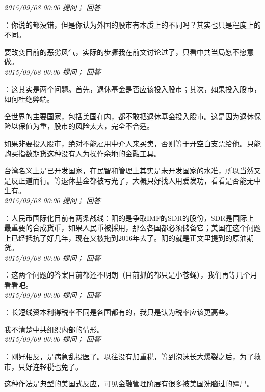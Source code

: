 \documentclass[twocolumn]{ctexart}
\begin{document}
\textit{\hfill\noindent\small 2015/09/08 00:00 提问； 回答}

：你说的都没错，但是你认为外国的股市有本质上的不同吗？其实也只是程度上的不同。

要改变目前的恶劣风气，实际的步骤我在前文讨论过了，只看中共当局愿不愿意做。\\

\textit{\hfill\noindent\small 2015/09/08 00:00 提问； 回答}

：这其实是两个问题。首先，退休基金是否应该投入股市；其次，如果投入股市，如何杜绝弊端。

全世界的主要国家，包括美国在内，都不敢把退休基金投入股市。这是因为退休保险以保值为重，股市的风险太大，完全不合适。

如果非要投入股市，绝对不能雇用中介人来买卖，否则等于开空白支票给他。只能购买指数期货这种没有人为操作余地的金融工具。

台湾名义上是已开发国家，在民智和管理上其实是未开发国家的水准，所以当然又是反正道而行。等退休基金都被亏光了，大概只好找人用爱发功，看看是否能无中生有。\\

\textit{\hfill\noindent\small 2015/09/08 00:00 提问； 回答}

：人民币国际化目前有两条战线：阳的是争取IMF的SDR的股份，SDR是国际上最重要的合成货币，如果人民币被採用，那么各国都必须储备它；美国在这个问题上已经抵抗了好几年，现在又被拖到2016年去了。阴的就是正文里提到的原油期货。\\

\textit{\hfill\noindent\small 2015/09/08 00:00 提问； 回答}

：这两个问题的答案目前都还不明朗（目前抓的都只是小苍蝇），我们再等几个月看看吧。\\

\textit{\hfill\noindent\small 2015/09/09 00:00 提问； 回答}

：长短线资本利得税率不同是各国都有的，我只是认为税率应该更高些。

我不清楚中共组织内部的情形。\\

\textit{\hfill\noindent\small 2015/09/09 00:00 提问； 回答}

：刚好相反，是病急乱投医了。以往没有加重税，等到泡沫长大爆裂之后，为了救市，只好连轻税也免了。

这种作法是典型的美国式反应，可见金融管理阶层有很多被美国洗脑过的殭尸。\\
\end{document}
